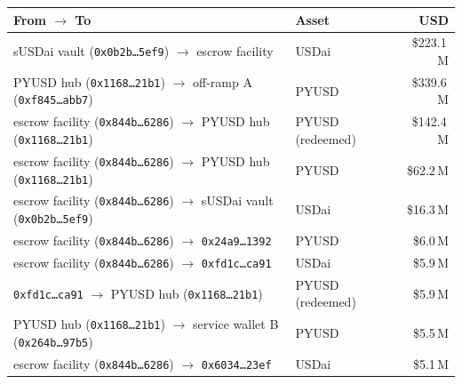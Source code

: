 \begin{tabular}{@{}llr@{}}
\toprule
From $\rightarrow$ To & Asset & USD \\
\midrule
sUSDai vault (\texttt{0x0b2b\ldots{}5ef9}) $\rightarrow$ escrow facility & USDai & \$223.1\,M \\
PYUSD hub (\texttt{0x1168\ldots{}21b1}) $\rightarrow$ off-ramp A (\texttt{0xf845\ldots{}abb7}) & PYUSD & \$339.6\,M \\
escrow facility (\texttt{0x844b\ldots{}6286}) $\rightarrow$ PYUSD hub (\texttt{0x1168\ldots{}21b1}) & PYUSD (redeemed) & \$142.4\,M \\
escrow facility (\texttt{0x844b\ldots{}6286}) $\rightarrow$ PYUSD hub (\texttt{0x1168\ldots{}21b1}) & PYUSD & \$62.2\,M \\
escrow facility (\texttt{0x844b\ldots{}6286}) $\rightarrow$ sUSDai vault (\texttt{0x0b2b\ldots{}5ef9}) & USDai & \$16.3\,M \\
escrow facility (\texttt{0x844b\ldots{}6286}) $\rightarrow$ \texttt{0x24a9\ldots{}1392} & PYUSD & \$6.0\,M \\
escrow facility (\texttt{0x844b\ldots{}6286}) $\rightarrow$ \texttt{0xfd1c\ldots{}ca91} & USDai & \$5.9\,M \\
\texttt{0xfd1c\ldots{}ca91} $\rightarrow$ PYUSD hub (\texttt{0x1168\ldots{}21b1}) & PYUSD (redeemed) & \$5.9\,M \\
PYUSD hub (\texttt{0x1168\ldots{}21b1}) $\rightarrow$ service wallet B (\texttt{0x264b\ldots{}97b5}) & PYUSD & \$5.5\,M \\
escrow facility (\texttt{0x844b\ldots{}6286}) $\rightarrow$ \texttt{0x6034\ldots{}23ef} & USDai & \$5.1\,M \\
\bottomrule
\end{tabular}
